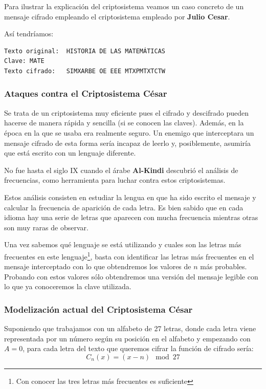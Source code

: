 \documentclass[nochap]{apuntesURJC}
\begin{document}
Para ilustrar la explicación del criptosistema veamos un caso concreto de un mensaje cifrado empleando el criptosistema empleado por \textbf{Julio Cesar}.

Así tendríamos:
\begin{verbatim}
Texto original:  HISTORIA DE LAS MATEMÁTICAS
Clave: MATE
Texto cifrado:   SIMXARBE OE EEE MTXPMTXTCTW
\end{verbatim}

\subsubsection{Ataques contra el Criptosistema César}
Se trata de un criptosistema muy eficiente pues el cifrado y descifrado pueden hacerse de manera rápida y sencilla (si se conocen las claves). Además, en la época en la que se usaba era realmente seguro. Un enemigo que interceptara un mensaje cifrado de esta forma sería incapaz de leerlo y, posiblemente, asumiría que está escrito con un lenguaje diferente.

No fue hasta el siglo IX cuando el árabe \textbf{Al-Kindi} descubrió el análisis de frecuencias, como herramienta para luchar contra estos criptosistemas.

Estos análisis consisten en estudiar la lengua en que ha sido escrito el mensaje y calcular la frecuencia de aparición de cada letra. Es bien sabido que en cada idioma hay una serie de letras que aparecen con mucha frecuencia mientras otras son muy raras de observar.

Una vez sabemos qué lenguaje se está utilizando y cuales son las letras más frecuentes en este lenguaje\footnote{Con conocer las tres letras más frecuentes es suficiente}, basta con identificar las letras más frecuentes en el mensaje interceptado con lo que obtendremos los valores de $n$ más probables. Probando con estos valores sólo obtendremos una versión del mensaje legible con lo que ya conoceremos la clave utilizada.

\subsubsection{Modelización actual del Criptosistema César}

Suponiendo que trabajamos con un alfabeto de 27 letras, donde cada letra viene representada por un número según su posición en el alfabeto y empezando con $A=0$, para cada letra del texto que queremos cifrar la función de cifrado sería:
\[C_n(x)=(x-n) \mod 27\]
\end{document}
